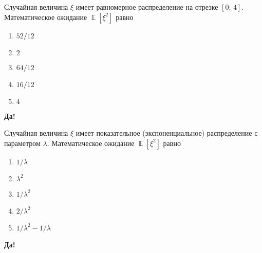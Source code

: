 \documentclass[t]{beamer}
\DeclareMathOperator{\E}{\mathbb{E}}
\begin{document}
 \begin{frame} \label{30-Yes} 
\begin{block}{30} 

Случайная величина $\xi$ имеет равномерное распределение на отрезке $[0;\,4]$. Математическое ожидание $\E[\xi^2]$ равно
  


 \end{block} 
\begin{enumerate} 
\item[] \hyperlink{30-No}{\beamergotobutton{}  $52/12$ }
\item[] \hyperlink{30-No}{\beamergotobutton{}  $2$ }
\item[] \hyperlink{30-Yes}{\beamergotobutton{}  $64/12$ }
\item[] \hyperlink{30-No}{\beamergotobutton{}  $16/12$ }
\item[] \hyperlink{30-No}{\beamergotobutton{}  $4$ }
\end{enumerate} 

 \textbf{Да!} 
 \hyperlink{31}{}\end{frame} 


 \begin{frame} \label{31-Yes} 
\begin{block}{31} 

Случайная величина $\xi$ имеет показательное (экспоненциальное) распределение с параметром $\lambda$. Математическое ожидание $\E[\xi^2]$ равно
  


 \end{block} 
\begin{enumerate} 
\item[] \hyperlink{31-No}{\beamergotobutton{}  $1/\lambda$ }
\item[] \hyperlink{31-No}{\beamergotobutton{}  $\lambda^2$ }
\item[] \hyperlink{31-No}{\beamergotobutton{}  $1/\lambda^2$ }
\item[] \hyperlink{31-Yes}{\beamergotobutton{}  $2/\lambda^2$ }
\item[] \hyperlink{31-No}{\beamergotobutton{}  $1/\lambda^2 - 1/ \lambda$ }
\end{enumerate} 

 \textbf{Да!} 
 \hyperlink{32}{}\end{frame} 
\end{document}
